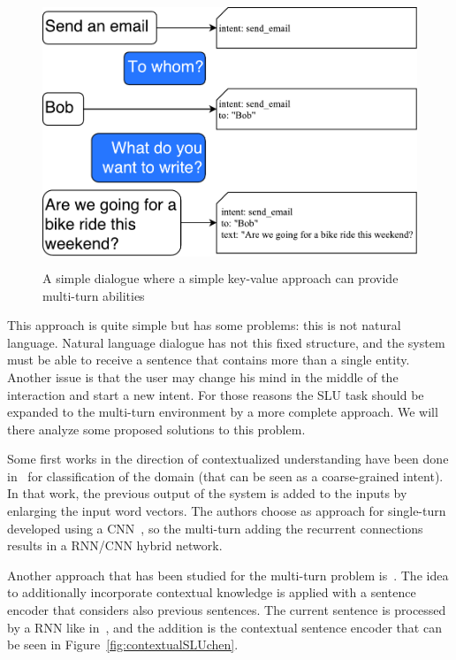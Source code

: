 \begin{figure}[!htbp]
    \centering
    \includegraphics[max width=\linewidth,max height=8cm,keepaspectratio]{figures/multiTurnFilling}
    \caption{A simple dialogue where a simple key-value approach can provide multi-turn abilities}\label{fig:multiTurnFilling}
\end{figure}

This approach is quite simple but has some problems: this is not natural language. Natural language dialogue has not this fixed structure, and the system must be able to receive a sentence that contains more than a single entity. Another issue is that the user may change his mind in the middle of the interaction and start a new intent. For those reasons the SLU task should be expanded to the multi-turn environment by a more complete approach. We will there analyze some proposed solutions to this problem.

Some first works in the direction of contextualized understanding have been done in~\cite{xu2014contextual} for classification of the domain (that can be seen as a coarse-grained intent). In that work, the previous output of the system is added to the inputs by enlarging the input word vectors. The authors choose as approach for single-turn developed using a  CNN~\cite{krizhevsky2012imagenet}, so the multi-turn adding the recurrent connections results in a RNN/CNN hybrid network.

Another approach that has been studied for the multi-turn problem is~\cite{chen2016end}. The idea to additionally incorporate contextual knowledge is applied with a sentence encoder that considers also previous sentences. The current sentence is processed by a RNN like in~\cite{liu2016attention}, and the addition is the contextual sentence encoder that can be seen in Figure~\ref{fig:contextualSLUchen}.

